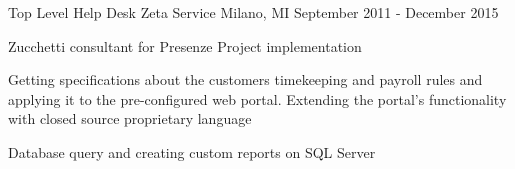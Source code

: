 \begin{cventries}
  \cventry
    {Top Level Help Desk} %
    {Zeta Service} %
    {Milano, MI} %
    {September 2011 - December 2015} %
    {
      \begin{cvitems} %
        \item {Zucchetti consultant for Presenze Project implementation}
        \item {Getting specifications about the customers timekeeping and payroll rules and applying it to the pre-configured web portal. Extending the portal’s functionality with closed source proprietary language}
        \item {Database query and creating custom reports on SQL Server}
      \end{cvitems}
    }
    
\end{cventries}
